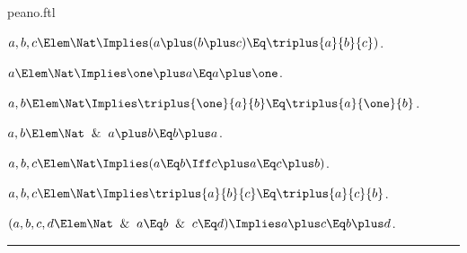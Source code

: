 \documentclass{stex}
\begin{document}
\begin{smodule}{peano.ftl}
\begin{forthel}
  \begin{theorem*}[title=23,name=P23]
    $a,b,c \Elem \Nat \Implies (a \plus (b \plus c) \Eq \triplus{a}{b}{c})$.
  \end{theorem*}

  \begin{theorem*}[title=24,name=P24]
    $a \Elem \Nat \Implies \one \plus a \Eq a \plus \one$.
  \end{theorem*}

  \begin{theorem*}[title=24',name=P24prime]
    $a,b \Elem \Nat \Implies \triplus{\one}{a}{b} \Eq \triplus{a}{\one}{b}$.
  \end{theorem*}

  \begin{theorem*}[title=25,name=P25]
    $a,b \Elem \Nat \And a \plus b \Eq b \plus a$.
  \end{theorem*}

  \begin{theorem*}[title=26,name=P26]
    $a,b,c \Elem \Nat \Implies (a \Eq b \Iff c \plus a \Eq c \plus b)$.
  \end{theorem*}

  \begin{theorem*}[title=27,name=P27]
    $a,b,c \Elem \Nat \Implies \triplus{a}{b}{c} \Eq \triplus{a}{c}{b}$.
  \end{theorem*}

  \begin{theorem*}[title=28,name=P28]
    $(a,b,c,d \Elem \Nat \And a \Eq b \And c \Eq d) \Implies a \plus c \Eq b \plus d$.
  \end{theorem*}
\end{forthel}

\vspace{1em}\hrule

\titleformat{\section}[hang]{\Large\bfseries}{}{0em}{}

\printbibliography
{}

\end{smodule}
\end{document}
